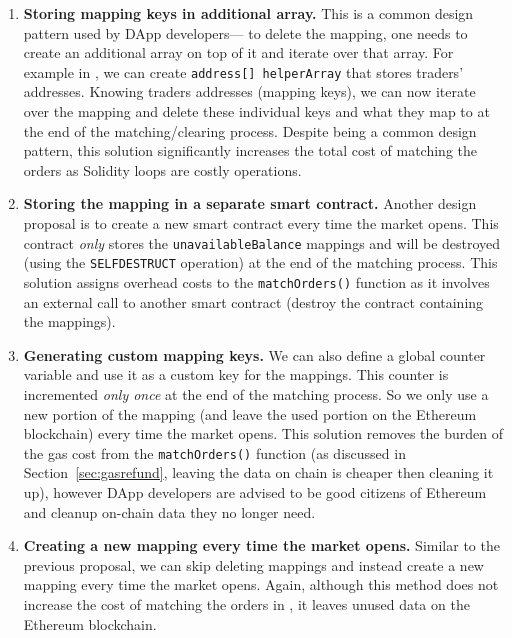 \begin{enumerate}

\item \textbf{Storing mapping keys in additional array.} This is a common design pattern used by DApp developers--- to delete the mapping, one needs to create an additional array on top of it and iterate over that array. For example in \cm, we can create \texttt{address[] helperArray} that stores traders' addresses. Knowing traders addresses (\ie mapping keys), we can now iterate over the mapping and delete these individual keys and what they map to at the end of the matching/clearing process. Despite being a common design pattern, this solution 
significantly increases the total cost of matching the orders as Solidity loops are costly operations. 


\item \textbf{Storing the mapping in a separate smart contract.} Another design proposal is to create a new smart contract every time the market opens. This contract \textit{only} stores the \texttt{unavailableBalance} mappings and will be destroyed (using the \texttt{SELFDESTRUCT} operation) at the end of the matching process. This solution assigns overhead costs to the \texttt{matchOrders()} function as it involves an external call to another smart contract (\ie destroy the contract containing the mappings).


\item \textbf{Generating custom mapping keys.} We can also define a global counter variable and use it as a custom key for the mappings. This counter is incremented \textit{only once} at the end of the matching process. So we only use a new portion of the mapping (and leave the used portion on the Ethereum blockchain) every time the market opens. This solution removes the burden of the gas cost from the \texttt{matchOrders()} function (as discussed in Section~\ref{sec:gasrefund}, leaving the data on chain is cheaper then cleaning it up), however DApp developers are advised to be good citizens of Ethereum and cleanup on-chain data they no longer need. 

\item \textbf{Creating a new mapping every time the market opens.} Similar to the previous proposal, we can skip deleting mappings and instead create a new mapping every time the market opens. Again, although this method does not increase the cost of matching the orders in \cm, it leaves unused data on the Ethereum blockchain. 



\end{enumerate}


